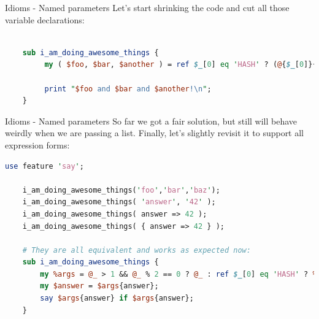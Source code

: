 \documentclass[10pt]{beamer}
\begin{document}
\begin{frame}[fragile]{Idioms - Named parameters}
Let's start shrinking the code and cut all those variable declarations:
\pause


\begin{lstlisting}[language=perl]

    sub i_am_doing_awesome_things {
         my ( $foo, $bar, $another ) = ref $_[0] eq 'HASH' ? (@{$_[0]}{qw(foo bar answer)}) : @_;

         print "$foo and $bar and $another!\n";
    }
\end{lstlisting}


\end{frame}

\begin{frame}[fragile]{Idioms - Named parameters}
So far we got a fair solution, but still will behave weirdly when we are passing a list. Finally, let's slightly revisit it to support all expression forms:

\pause

\begin{lstlisting}[language=perl]
    use feature 'say';

    i_am_doing_awesome_things('foo','bar','baz');
    i_am_doing_awesome_things( 'answer', '42' );
    i_am_doing_awesome_things( answer => 42 );
    i_am_doing_awesome_things( { answer => 42 } );

    # They are all equivalent and works as expected now:
    sub i_am_doing_awesome_things {
        my %args = @_ > 1 && @_ % 2 == 0 ? @_ : ref $_[0] eq 'HASH' ? %{ $_[0] } : ();
        my $answer = $args{answer};
        say $args{answer} if $args{answer};
    }
\end{lstlisting}


\end{frame}
\end{document}
